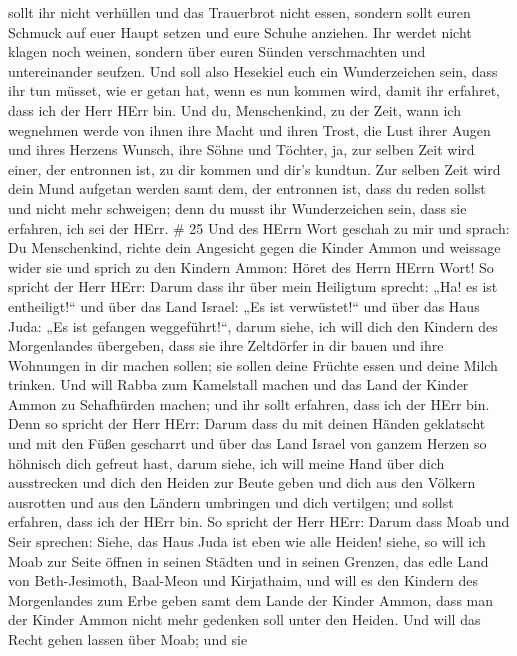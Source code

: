 sollt ihr nicht verhüllen und das Trauerbrot nicht essen, 
sondern sollt euren Schmuck auf euer Haupt setzen und eure Schuhe
anziehen. Ihr werdet nicht klagen noch weinen, sondern über euren Sünden
verschmachten und untereinander seufzen.  Und soll also
Hesekiel euch ein Wunderzeichen sein, dass ihr tun müsset, wie er getan
hat, wenn es nun kommen wird, damit ihr erfahret, dass ich der Herr HErr
bin.  Und du, Menschenkind, zu der Zeit, wann ich wegnehmen
werde von ihnen ihre Macht und ihren Trost, die Lust ihrer Augen und
ihres Herzens Wunsch, ihre Söhne und Töchter,  ja, zur
selben Zeit wird einer, der entronnen ist, zu dir kommen und dir's
kundtun.  Zur selben Zeit wird dein Mund aufgetan werden
samt dem, der entronnen ist, dass du reden sollst und nicht mehr
schweigen; denn du musst ihr Wunderzeichen sein, dass sie erfahren, ich
sei der HErr. \# 25  Und des HErrn Wort geschah zu mir und
sprach:  Du Menschenkind, richte dein Angesicht gegen die
Kinder Ammon und weissage wider sie  und sprich zu den
Kindern Ammon: Höret des Herrn HErrn Wort! So spricht der Herr HErr:
Darum dass ihr über mein Heiligtum sprecht: „Ha! es ist entheiligt!{}``
und über das Land Israel: „Es ist verwüstet!{}`` und über das Haus Juda:
„Es ist gefangen weggeführt!{}``,  darum siehe, ich will
dich den Kindern des Morgenlandes übergeben, dass sie ihre Zeltdörfer in
dir bauen und ihre Wohnungen in dir machen sollen; sie sollen deine
Früchte essen und deine Milch trinken.  Und will Rabba zum
Kamelstall machen und das Land der Kinder Ammon zu Schafhürden machen;
und ihr sollt erfahren, dass ich der HErr bin.  Denn so
spricht der Herr HErr: Darum dass du mit deinen Händen geklatscht und
mit den Füßen gescharrt und über das Land Israel von ganzem Herzen so
höhnisch dich gefreut hast,  darum siehe, ich will meine
Hand über dich ausstrecken und dich den Heiden zur Beute geben und dich
aus den Völkern ausrotten und aus den Ländern umbringen und dich
vertilgen; und sollst erfahren, dass ich der HErr bin.  So
spricht der Herr HErr: Darum dass Moab und Seir sprechen: Siehe, das
Haus Juda ist eben wie alle Heiden!  siehe, so will ich Moab
zur Seite öffnen in seinen Städten und in seinen Grenzen, das edle Land
von Beth-Jesimoth, Baal-Meon und Kirjathaim,  und will es
den Kindern des Morgenlandes zum Erbe geben samt dem Lande der Kinder
Ammon, dass man der Kinder Ammon nicht mehr gedenken soll unter den
Heiden.  Und will das Recht gehen lassen über Moab; und sie
